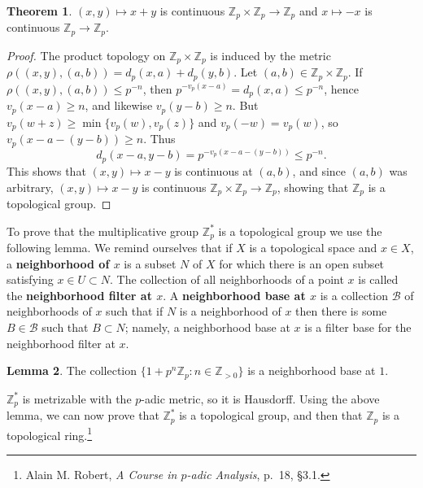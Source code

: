\documentclass{article}
\theoremstyle{definition}
\newtheorem{theorem}{Theorem}
\newtheorem{lemma}[theorem]{Lemma}
\theoremstyle{definition}
\begin{document}
\begin{theorem}
$(x,y) \mapsto x+y$ is continuous $\mathbb{Z}_p \times \mathbb{Z}_p \to \mathbb{Z}_p$ and $x \mapsto -x$ is continuous
$\mathbb{Z}_p \to \mathbb{Z}_p$. 
\end{theorem}
\begin{proof}
The product topology on $\mathbb{Z}_p \times \mathbb{Z}_p$ is
induced by the metric $\rho((x,y),(a,b))=d_p(x,a)+d_p(y,b)$. 
Let $(a,b) \in \mathbb{Z}_p \times \mathbb{Z}_p$. If $\rho((x,y),(a,b)) \leq p^{-n}$, then
$p^{-v_p(x-a)}=d_p(x,a) \leq p^{-n}$, hence $v_p(x-a) \geq n$, and likewise
$v_p(y-b) \geq n$. But $v_p(w+z) \geq \min\{v_p(w),v_p(z)\}$ and $v_p(-w)=v_p(w)$, so
$v_p(x-a-(y-b)) \geq n$. Thus
\[
d_p(x-a,y-b) = p^{-v_p(x-a-(y-b))} \leq p^{-n}.
\]
This shows that $(x,y) \mapsto x-y$ is continuous at $(a,b)$, and since $(a,b)$ was arbitrary, $(x,y) \mapsto x-y$ is continuous
$\mathbb{Z}_p \times \mathbb{Z}_p \to \mathbb{Z}_p$, showing that $\mathbb{Z}_p$ is a topological group. 
\end{proof}


To prove that the multiplicative group $\mathbb{Z}_p^*$ is a topological group we use the following lemma. We remind ourselves that if $X$ is a topological space and $x \in X$,
a \textbf{neighborhood of $x$} is a subset $N$ of $X$ for which there is an open subset satisfying $x \in U \subset N$. 
The collection of all neighborhoods of a point $x$ is called the
 \textbf{neighborhood filter at $x$}. A \textbf{neighborhood base at $x$} is a collection $\mathscr{B}$ of neighborhoods of $x$ such that if $N$ is a neighborhood of $x$
 then there is some $B \in \mathscr{B}$ such that $B \subset N$; namely, a neighborhood base at $x$ is a filter base for the neighborhood filter
 at $x$. 

\begin{lemma}
The collection $\{1+p^n\mathbb{Z}_p: n \in \mathbb{Z}_{>0}\}$ is a neighborhood base at $1$.
\end{lemma}

$\mathbb{Z}_p^*$ is metrizable with the $p$-adic metric,
so it is Hausdorff.
Using the above lemma, we can now prove that $\mathbb{Z}_p^*$ is a topological group, and then that
$\mathbb{Z}_p$ is a topological ring.\footnote{Alain M. Robert, {\em A Course in $p$-adic Analysis},
p.~18, \S 3.1.}
\end{document}
